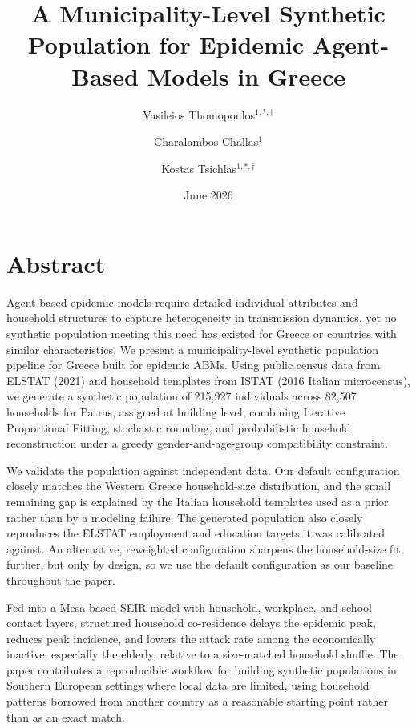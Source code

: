 \documentclass{article}
\title{A Municipality-Level Synthetic Population for Epidemic Agent-Based Models in Greece}
\author{Vasileios Thomopoulos$^{1,\ast,\dagger}$ \and Charalambos Challas$^{1}$ \and Kostas Tsichlas$^{1,\ast,\dagger}$}
\date{June 2026}
\begin{document}
\maketitle
{\renewcommand{\thefootnote}{}
}

\section{Abstract}\label{abstract}

Agent-based epidemic models require detailed individual attributes and household structures to capture heterogeneity in transmission dynamics, yet no synthetic population meeting this need has existed for Greece or countries with similar characteristics. We present a municipality-level synthetic population pipeline for Greece built for epidemic ABMs. Using public census data from ELSTAT (2021) and household templates from ISTAT (2016 Italian microcensus), we generate a synthetic population of 215,927 individuals across 82,507 households for Patras, assigned at building level, combining Iterative Proportional Fitting, stochastic rounding, and probabilistic household reconstruction under a greedy gender-and-age-group compatibility constraint.

We validate the population against independent data. Our default configuration closely matches the Western Greece household-size distribution, and the small remaining gap is explained by the Italian household templates used as a prior rather than by a modeling failure. The generated population also closely reproduces the ELSTAT employment and education targets it was calibrated against. An alternative, reweighted configuration sharpens the household-size fit further, but only by design, so we use the default configuration as our baseline throughout the paper.

Fed into a Mesa-based SEIR model with household, workplace, and school contact layers, structured household co-residence delays the epidemic peak, reduces peak incidence, and lowers the attack rate among the economically inactive, especially the elderly, relative to a size-matched household shuffle. The paper contributes a reproducible workflow for building synthetic populations in Southern European settings where local data are limited, using household patterns borrowed from another country as a reasonable starting point rather than as an exact match.
\end{document}

